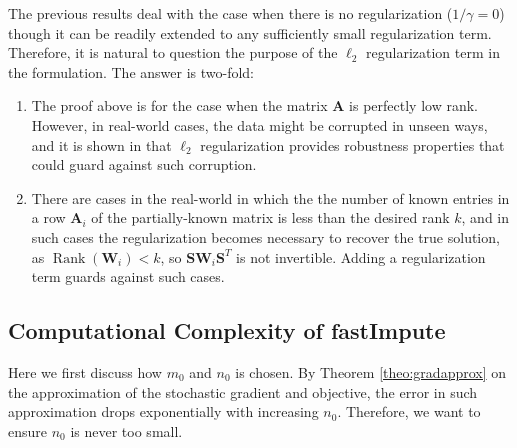 \documentclass[twoside,11pt]{article}
\DeclareMathOperator\rank{Rank}
\begin{document}
The previous results deal with the case when there is no regularization ($1/\gamma=0$) though it can be readily extended to any sufficiently small regularization term. Therefore, it is natural to question the purpose of the $\ell_2$ regularization term in the formulation. The answer is two-fold:
\begin{enumerate}
    \item The proof above is for the case when the matrix $\bm{A}$ is perfectly low rank.  However, in real-world cases, the data might be corrupted in unseen ways, and it is shown in \cite{bertsimas2018characterization} that $\ell_2$ regularization provides robustness properties that could guard against such corruption. 
    \item There are cases in the real-world in which the the number of known entries in a row $\bm{A}_i$ of the partially-known matrix is less than the desired rank $k$, and in such cases the regularization becomes necessary to recover the true solution, as $\rank(\bm{W}_i)<k$, so $\bm{S}\bm{W}_i\bm{S}^T$ is not invertible. Adding a regularization term guards against such cases. 
\end{enumerate}
\subsection{Computational Complexity of fastImpute}
\label{subsec:fastimputescomp}
Here we  first discuss how $m_0$ and $n_0$ is chosen.
By Theorem \ref{theo:gradapprox} on the approximation of the stochastic gradient and objective, the error in such approximation drops exponentially with increasing $n_0$. Therefore, we 
 want to ensure $n_0$ is never too small. 
\end{document}
